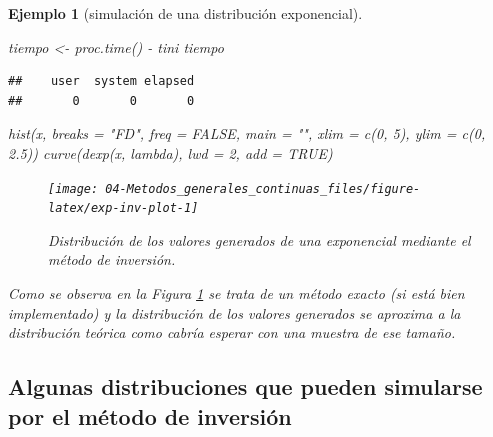 \documentclass[
]{book}
\newenvironment{Shaded}{\begin{snugshade}}{\end{snugshade}}
\newcommand{\AttributeTok}[1]{\textcolor[rgb]{0.77,0.63,0.00}{#1}}
\newcommand{\ConstantTok}[1]{\textcolor[rgb]{0.00,0.00,0.00}{#1}}
\newcommand{\DecValTok}[1]{\textcolor[rgb]{0.00,0.00,0.81}{#1}}
\newcommand{\FloatTok}[1]{\textcolor[rgb]{0.00,0.00,0.81}{#1}}
\newcommand{\FunctionTok}[1]{\textcolor[rgb]{0.00,0.00,0.00}{#1}}
\newcommand{\NormalTok}[1]{#1}
\newcommand{\OtherTok}[1]{\textcolor[rgb]{0.56,0.35,0.01}{#1}}
\newcommand{\SpecialCharTok}[1]{\textcolor[rgb]{0.00,0.00,0.00}{#1}}
\newcommand{\StringTok}[1]{\textcolor[rgb]{0.31,0.60,0.02}{#1}}
\theoremstyle{break}
\newtheorem{example}{Ejemplo}[chapter]
\theoremstyle{nonumberplain}
\begin{document}
\begin{example}[simulación de una distribución exponencial]
\begin{Shaded}
\begin{Highlighting}[]
\NormalTok{tiempo }\OtherTok{\textless{}{-}} \FunctionTok{proc.time}\NormalTok{() }\SpecialCharTok{{-}}\NormalTok{ tini}
\NormalTok{tiempo}
\end{Highlighting}
\end{Shaded}

\begin{verbatim}
##    user  system elapsed 
##       0       0       0
\end{verbatim}

\begin{Shaded}
\begin{Highlighting}[]
\FunctionTok{hist}\NormalTok{(x, }\AttributeTok{breaks =} \StringTok{"FD"}\NormalTok{, }\AttributeTok{freq =} \ConstantTok{FALSE}\NormalTok{, }
        \AttributeTok{main =} \StringTok{""}\NormalTok{, }\AttributeTok{xlim =} \FunctionTok{c}\NormalTok{(}\DecValTok{0}\NormalTok{, }\DecValTok{5}\NormalTok{), }\AttributeTok{ylim =} \FunctionTok{c}\NormalTok{(}\DecValTok{0}\NormalTok{, }\FloatTok{2.5}\NormalTok{))}
\FunctionTok{curve}\NormalTok{(}\FunctionTok{dexp}\NormalTok{(x, lambda), }\AttributeTok{lwd =} \DecValTok{2}\NormalTok{, }\AttributeTok{add =} \ConstantTok{TRUE}\NormalTok{)}
\end{Highlighting}
\end{Shaded}

\begin{figure}[!htb]

{\centering \texttt{[image: 04-Metodos\_generales\_continuas\_files/figure-latex/exp-inv-plot-1]} 

}

\caption{Distribución de los valores generados de una exponencial mediante el método de inversión.}\label{fig:exp-inv-plot}
\end{figure}

Como se observa en la Figura \ref{fig:exp-inv-plot} se trata de un método exacto (si está bien implementado) y la distribución de los valores generados se aproxima a la distribución teórica como cabría esperar con una muestra de ese tamaño.
\end{example}

\hypertarget{algunas-distribuciones-que-pueden-simularse-por-el-muxe9todo-de-inversiuxf3n}{%
\subsection{Algunas distribuciones que pueden simularse por el método de inversión}\label{algunas-distribuciones-que-pueden-simularse-por-el-muxe9todo-de-inversiuxf3n}}
\end{document}
